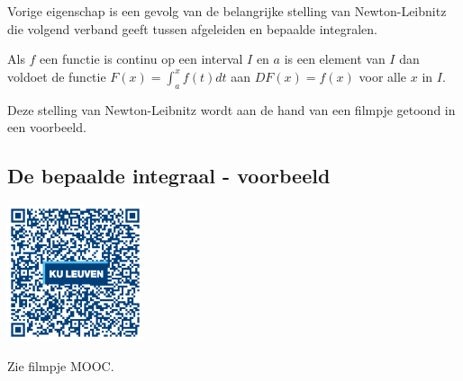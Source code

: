 Vorige eigenschap is een gevolg van de belangrijke stelling van Newton-Leibnitz die volgend verband geeft tussen afgeleiden en bepaalde integralen.

\begin{eigenschap}
	Als $f$ een functie is continu op een interval $I$ en $a$ is een element van $I$ dan voldoet de functie $F(x) = \int^x_a f(t)dt$ aan $DF(x)=f(x)$ voor alle $x$ in $I$.
\end{eigenschap}

Deze stelling van Newton-Leibnitz wordt aan de hand van een filmpje getoond in een voorbeeld.

%
%
%
%
%
%


\subsection{De bepaalde integraal - voorbeeld}
\begin{minipage}{.25\linewidth}
	\raggedright
	\includegraphics[width=4cm]{6_afgeleiden_integralen/inputs/QR_Code_BEPINTVB_module6_2new}
\end{minipage}
\begin{minipage}{.7\linewidth}
	Zie filmpje MOOC.
\end{minipage}


